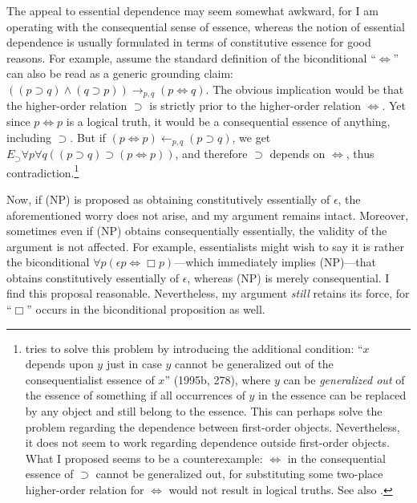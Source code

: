 \documentclass[12pt]{article}
\begin{document}
The appeal to essential dependence may seem somewhat awkward, for I am operating with the consequential sense of essence, whereas the notion of essential dependence is usually formulated in terms of constitutive essence for good reasons. For example, assume the standard definition of the biconditional ``$\Leftrightarrow$'' can also be read as a generic grounding claim: $((p \supset q) \land (q \supset p)) \bm{\rightarrow}_{p,q} (p \Leftrightarrow q)$. The obvious implication would be that the higher-order relation $\supset$ is strictly prior to the higher-order relation $\Leftrightarrow$. Yet since $p \Leftrightarrow p$ is a logical truth, it would be a consequential essence of anything, including $\supset$. But if $(p \Leftrightarrow p) \bm{\leftarrow}_{p, q} (p \supset q)$, we get $E_{\supset} \forall p \forall q ((p \supset q) \supset (p \Leftrightarrow p))$, and therefore $\supset$ depends on $\Leftrightarrow$, thus contradiction.\footnote{
    \citet{Fine1995-FINXD} tries to solve this problem by introducing the additional condition: ``$x$ depends upon $y$ just in case $y$ cannot be generalized out of the consequentialist essence of $x$'' (1995b, 278), where $y$ can be \textit{generalized out} of the essence of something if all occurrences of $y$ in the essence can be replaced by any object and still belong to the essence. This can perhaps solve the problem regarding the dependence between first-order objects. Nevertheless, it does not seem to work regarding dependence outside first-order objects. What I proposed seems to be a counterexample: $\Leftrightarrow$ in the consequential essence of $\supset$ cannot be generalized out, for substituting some two-place higher-order relation for $\Leftrightarrow$ would not result in logical truths. See also \citet{Vogt2026-VOGUEH}.
}
\par
Now, if (NP) is proposed as obtaining constitutively essentially of $\epsilon$, the aforementioned worry does not arise, and my argument remains intact. Moreover, sometimes even if (NP) obtains consequentially essentially, the validity of the argument is not affected. For example, essentialists might wish to say it is rather the biconditional $\forall p (\epsilon p \Leftrightarrow \Box p)$---which immediately implies (NP)---that obtains constitutively essentially of $\epsilon$, whereas (NP) is merely consequential. I find this proposal reasonable. Nevertheless, my argument \textit{still} retains its force, for ``$\Box$'' occurs in the biconditional proposition as well.
\par
\end{document}
